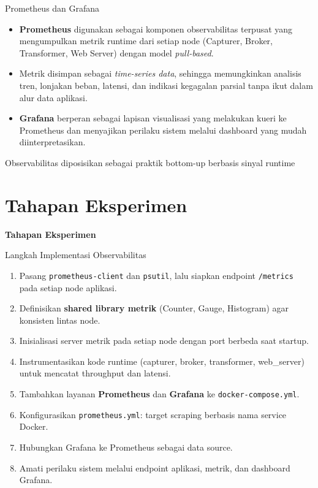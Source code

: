 \documentclass[aspectratio=169, table]{beamer}
\begin{document}
\begin{frame}{Prometheus dan Grafana}
	\vspace{20pt}
	\begin{itemize}
		\item \textbf{Prometheus} digunakan sebagai komponen observabilitas terpusat yang mengumpulkan metrik runtime dari setiap node (Capturer, Broker, Transformer, Web Server) dengan model \emph{pull-based}.
		\item Metrik disimpan sebagai \emph{time-series data}, sehingga memungkinkan analisis tren, lonjakan beban, latensi, dan indikasi kegagalan parsial tanpa ikut dalam alur data aplikasi.
		\item \textbf{Grafana} berperan sebagai lapisan visualisasi yang melakukan kueri ke Prometheus dan menyajikan perilaku sistem melalui dashboard yang mudah diinterpretasikan.
	\end{itemize}
	
	\vspace{4pt}
	{\footnotesize Observabilitas diposisikan sebagai praktik bottom-up berbasis sinyal runtime}
\end{frame}

	\section{Tahapan Eksperimen}
	
	\begin{frame}{\hfill}
		\centering
		\Huge{\textbf{Tahapan Eksperimen}}
	\end{frame}

\begin{frame}{Langkah Implementasi Observabilitas}
	\vspace{20pt}
	\begin{enumerate}
		\item Pasang \texttt{prometheus-client} dan \texttt{psutil}, lalu siapkan endpoint \texttt{/metrics} pada setiap node aplikasi.
		\item Definisikan \textbf{shared library metrik} (Counter, Gauge, Histogram) agar konsisten lintas node.
		\item Inisialisasi server metrik pada setiap node dengan port berbeda saat startup.
		\item Instrumentasikan kode runtime (capturer, broker, transformer, web\_server) untuk mencatat throughput dan latensi.
		\item Tambahkan layanan \textbf{Prometheus} dan \textbf{Grafana} ke \texttt{docker-compose.yml}.
		\item Konfigurasikan \texttt{prometheus.yml}: target scraping berbasis nama service Docker.
		\item Hubungkan Grafana ke Prometheus sebagai data source.
		\item Amati perilaku sistem melalui endpoint aplikasi, metrik, dan dashboard Grafana.
	\end{enumerate}
\end{frame}
\end{document}

